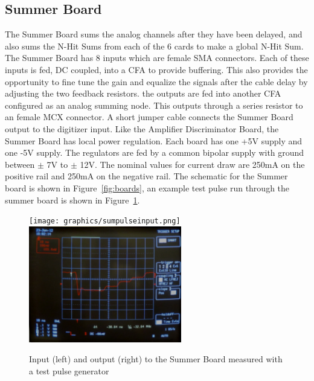 \documentclass{JINST}
\begin{document}
\subsection{Summer Board}
\label{sec:Sum}
%
The Summer Board sums the analog channels after they have been
delayed, and also sums the N-Hit Sums from each of the 6 cards to make
a global N-Hit Sum.  The Summer Board has 8 inputs which are female
SMA connectors.  Each of these inputs is fed, DC coupled, into a CFA
to provide buffering.  This also provides the opportunity to fine tune
the gain and equalize the signals after the cable delay by adjusting
the two feedback resistors.  the outputs are fed into another CFA
configured as an analog summing node.  This outputs through a series
resistor to an female MCX connector.  A short jumper cable connects
the Summer Board output to the digitizer input.  Like the Amplifier
Discriminator Board, the Summer Board has local power regulation.
Each board has one +5V supply and one -5V supply.  The regulators are
fed by a common bipolar supply with ground between $\pm$ 7V to $\pm$
12V.  The nominal values for current draw are 250mA on the positive
rail and 250mA on the negative rail.  The schematic for the Summer
board is shown in Figure~\ref{fig:boards}, an example test pulse run
through the summer board is shown in Figure~\ref{fig:summerpulse}.

\begin{figure}[ht]
	\begin{center}
		\texttt{[image: graphics/sumpulseinput.png]}
		\includegraphics[height=2in, keepaspectratio=true]{graphics/sumpulseoutput.png}
		\caption{Input (left) and output (right) to the Summer Board measured with a test pulse generator
		\label{fig:summerpulse}}
	\end{center}
\end{figure}
\end{document}
